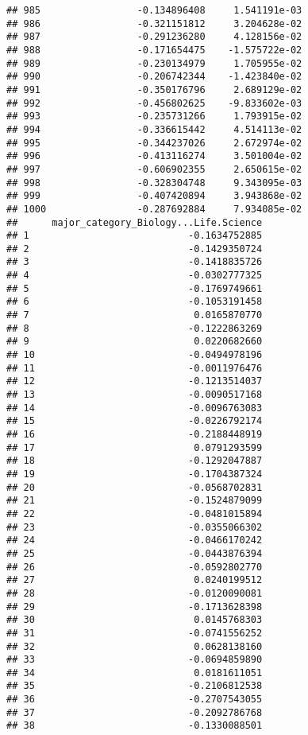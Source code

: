 \documentclass[
]{article}
\begin{document}
\begin{verbatim}
## 985                 -0.134896408     1.541191e-03
## 986                 -0.321151812     3.204628e-02
## 987                 -0.291236280     4.128156e-02
## 988                 -0.171654475    -1.575722e-02
## 989                 -0.230134979     1.705955e-02
## 990                 -0.206742344    -1.423840e-02
## 991                 -0.350176796     2.689129e-02
## 992                 -0.456802625    -9.833602e-03
## 993                 -0.235731266     1.793915e-02
## 994                 -0.336615442     4.514113e-02
## 995                 -0.344237026     2.672974e-02
## 996                 -0.413116274     3.501004e-02
## 997                 -0.606902355     2.650615e-02
## 998                 -0.328304748     9.343095e-03
## 999                 -0.407420894     3.943868e-02
## 1000                -0.287692884     7.934085e-02
##      major_category_Biology...Life.Science
## 1                            -0.1634752885
## 2                            -0.1429350724
## 3                            -0.1418835726
## 4                            -0.0302777325
## 5                            -0.1769749661
## 6                            -0.1053191458
## 7                             0.0165870770
## 8                            -0.1222863269
## 9                             0.0220682660
## 10                           -0.0494978196
## 11                           -0.0011976476
## 12                           -0.1213514037
## 13                           -0.0090517168
## 14                           -0.0096763083
## 15                           -0.0226792174
## 16                           -0.2188448919
## 17                            0.0791293599
## 18                           -0.1292047887
## 19                           -0.1704387324
## 20                           -0.0568702831
## 21                           -0.1524879099
## 22                           -0.0481015894
## 23                           -0.0355066302
## 24                           -0.0466170242
## 25                           -0.0443876394
## 26                           -0.0592802770
## 27                            0.0240199512
## 28                           -0.0120090081
## 29                           -0.1713628398
## 30                            0.0145768303
## 31                           -0.0741556252
## 32                            0.0628138160
## 33                           -0.0694859890
## 34                            0.0181611051
## 35                           -0.2106812538
## 36                           -0.2707543055
## 37                           -0.2092786768
## 38                           -0.1330088501

\end{verbatim}
\end{document}
